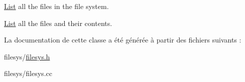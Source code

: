 \hyperlink{class_list}{List} all the files in the file system. 

\hyperlink{class_list}{List} all the files and their contents. 

La documentation de cette classe a été générée à partir des fichiers suivants \+:\begin{DoxyCompactItemize}
\item 
filesys/\hyperlink{filesys_8h}{filesys.\+h}\item 
filesys/filesys.\+cc\end{DoxyCompactItemize}

